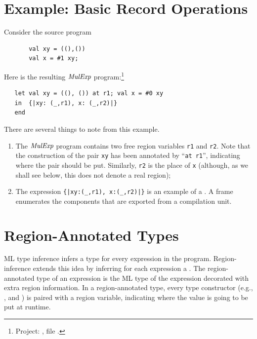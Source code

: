 \documentclass[12pt]{book}
\begin{document}
\section{Example: Basic Record Operations}
\label{proj.ex}
Consider the source program
\begin{verbatim}
       val xy = ((),()) 
       val x = #1 xy;
\end{verbatim}
Here is the resulting $\hbox{\it MulExp}$ program:\footnote{Project: , file .}
\begin{verbatim}
   let val xy = ((), ()) at r1; val x = #0 xy
   in  {|xy: (_,r1), x: (_,r2)|}
   end 
\end{verbatim}
There are several things to note from this example. 
\begin{enumerate}
\item The $\hbox{\it MulExp}$ program contains two free region variables
      {\tt r1} and {\tt r2}. Note that the construction of the
      pair {\tt xy} has been annotated by ``{\tt at r1}'', indicating
      where the pair should be put. Similarly, {\tt r2} is the
      place of {\tt x} (although, as we shall see below, this does
      not denote a real region);
\item The expression {\tt \{|xy:(\_,r1), x:(\_,r2)|\}} is
      an example of a . A frame enumerates
      the components that are exported from a compilation unit.
\end{enumerate}
\section{Region-Annotated Types}
ML type inference infers a type for every expression in the program.
Region-inference extends this idea by inferring for each expression a
. The region-annotated type of an expression
is the ML type of the expression decorated with extra region information.
In a region-annotated type, every type constructor (e.g., ,
 and ) is paired with a region variable, indicating
where the value is going to be put at runtime.
\end{document}
